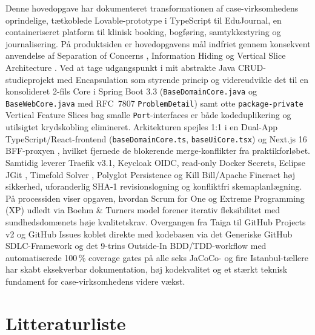 \documentclass[11pt,a4paper]{article}
\begin{document}
Denne hovedopgave har dokumenteret transformationen af case-virksomhedens oprindelige, tætkoblede Lovable-prototype i TypeScript til EduJournal, en containeriseret platform til klinisk booking, bogføring, samtykkestyring og journalisering.
\newline
På produktsiden er hovedopgavens mål indfriet gennem konsekvent anvendelse af Separation of Concerns \cite{fowler2002}, Information Hiding \cite{parnas1972} og Vertical Slice Architecture \cite{bogard2018}. Ved at tage udgangspunkt i mit abstrakte Java CRUD-studieprojekt med Encapsulation som styrende princip og videreudvikle det til en konsolideret 2-fils Core i Spring Boot 3.3 (\texttt{BaseDomainCore.java} og \texttt{BaseWebCore.java} med RFC~7807 \texttt{ProblemDetail}) samt otte \texttt{package-private} Vertical Feature Slices bag smalle \texttt{Port}-interfaces er både kodeduplikering og utilsigtet krydskobling elimineret. Arkitekturen spejles 1:1 i en Dual-App TypeScript/React-frontend (\texttt{baseDomainCore.ts}, \texttt{baseUiCore.tsx}) og Next.js 16 BFF-proxyen \cite{newman2021}, hvilket fjernede de blokerende merge-konflikter fra praktikforløbet. Samtidig leverer Traefik v3.1, Keycloak OIDC, read-only Docker Secrets, Eclipse JGit \cite{jgit2024}, Timefold Solver \cite{timefold2024}, Polyglot Persistence og Kill Bill/Apache Fineract høj sikkerhed, uforanderlig SHA-1 revisionslogning og konfliktfri skemaplanlægning.
\newline
På processiden viser opgaven, hvordan Scrum for One \cite{schwaber2020} og Extreme Programming (XP) \cite{beck2004} udledt via Boehm \& Turners model \cite{boehm2003} forener iterativ fleksibilitet med sundhedsdomænets høje kvalitetskrav. Overgangen fra Taiga til GitHub Projects v2 og GitHub Issues koblet direkte med kodebasen via det Generiske GitHub SDLC-Framework og det 9-trins Outside-In BDD/TDD-workflow med automatiserede 100\,\% coverage gates på alle seks JaCoCo- og fire Istanbul-tællere har skabt eksekverbar dokumentation, høj kodekvalitet og et stærkt teknisk fundament for case-virksomhedens videre vækst.

\newpage
\section{Litteraturliste}
\end{document}
